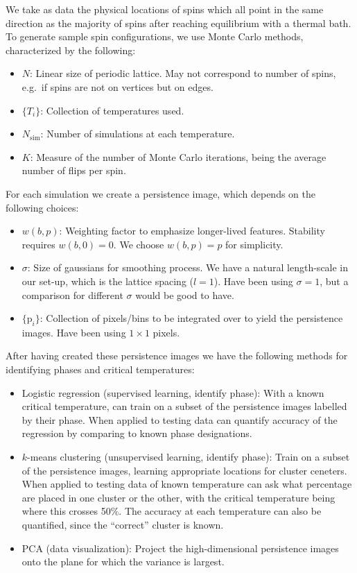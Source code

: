 \documentclass[11pt]{article}
\begin{document}
We take as data the physical locations of spins which all point in the same direction as the majority of spins after reaching equilibrium with a thermal bath. To generate sample spin configurations, we use Monte Carlo methods, characterized by the following:
\begin{itemize}
    \item $N$: Linear size of periodic lattice. May not correspond to number of spins, e.g.~if spins are not on vertices but on edges.
    \item $\{T_i\}$: Collection of temperatures used.
    \item $N_\text{sim}$: Number of simulations at each temperature.
    \item $K$: Measure of the number of Monte Carlo iterations, being the average number of flips per spin.
\end{itemize}
For each simulation we create a persistence image, which depends on the following choices:
\begin{itemize}
    \item $w(b,p)$: Weighting factor to emphasize longer-lived features. Stability requires $w(b,0)=0$. We choose $w(b,p)=p$ for simplicity.
    \item $\sigma$: Size of gaussians for smoothing process. We have a natural length-scale in our set-up, which is the lattice spacing ($l=1$). Have been using $\sigma=1$, but a comparison for different $\sigma$ would be good to have.
    \item $\{\text{p}_i\}$: Collection of pixels/bins to be integrated over to yield the persistence images. Have been using $1\times 1$ pixels.
\end{itemize}
After having created these persistence images we have the following methods for identifying phases and critical temperatures:
\begin{itemize}
    \item Logistic regression (supervised learning, identify phase): With a known critical temperature, can train on a subset of the persistence images labelled by their phase. When applied to testing data can quantify accuracy of the regression by comparing to known phase designations.
    \item $k$-means clustering (unsupervised learning, identify phase): Train on a subset of the persistence images, learning appropriate locations for cluster ceneters. When applied to testing data of known temperature can ask what percentage are placed in one cluster or the other, with the critical temperature being where this crosses 50\%. The accuracy at each temperature can also be quantified, since the ``correct'' cluster is known.
    \item PCA (data visualization): Project the high-dimensional persistence images onto the plane for which the variance is largest.
\end{itemize}
\end{document}
